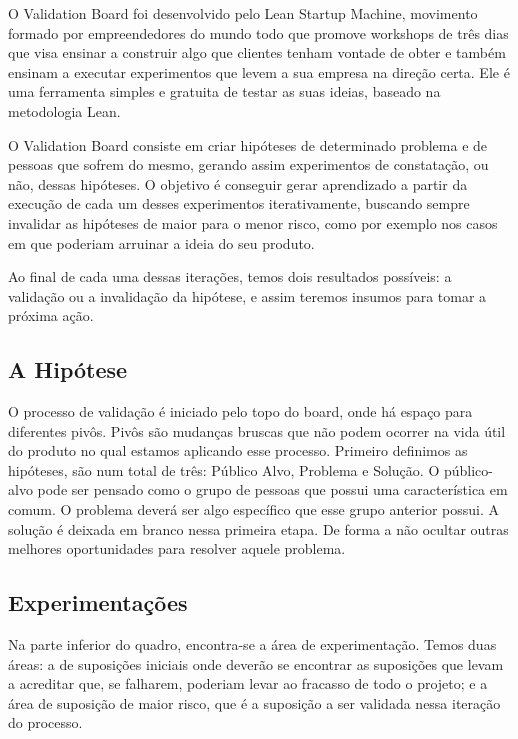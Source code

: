 O Validation Board foi desenvolvido pelo Lean Startup Machine, movimento formado por empreendedores do mundo todo que promove workshops de três dias que visa ensinar a construir algo que clientes tenham vontade de obter e também ensinam a executar experimentos que levem a sua empresa na direção certa. Ele é uma ferramenta simples e gratuita de testar as suas ideias, baseado na metodologia Lean\cite{art:REF_ART_2}.

O Validation Board consiste em criar hipóteses de determinado problema e de pessoas que sofrem do mesmo, gerando assim experimentos de constatação, ou não, dessas hipóteses. O objetivo é conseguir gerar aprendizado a partir da execução de cada um desses experimentos iterativamente, buscando sempre invalidar as hipóteses de maior para o menor risco, como por exemplo nos casos em que poderiam arruinar a ideia do seu produto.

Ao final de cada uma dessas iterações, temos dois resultados possíveis: a validação ou a invalidação da hipótese, e assim teremos insumos para tomar a próxima ação.

\subsection{A Hipótese}

O processo de validação é iniciado pelo topo do board, onde há espaço para diferentes pivôs. Pivôs são mudanças bruscas que não podem ocorrer na vida útil do produto no qual estamos aplicando esse processo. Primeiro definimos as hipóteses, são num total de três: Público Alvo, Problema e Solução. O público-alvo pode ser pensado como o grupo de pessoas que possui uma característica em comum. O problema deverá ser algo específico que esse grupo anterior possui. A solução é deixada em branco nessa primeira etapa. De forma a não ocultar outras  melhores oportunidades para resolver aquele problema. 

\subsection{Experimentações}

Na parte inferior do quadro, encontra-se a área de experimentação. Temos duas áreas: a de suposições iniciais onde deverão se encontrar as suposições que levam a acreditar que, se falharem, poderiam levar ao fracasso de todo o projeto; e a área de suposição de maior risco, que é a suposição a ser validada nessa iteração do processo.

